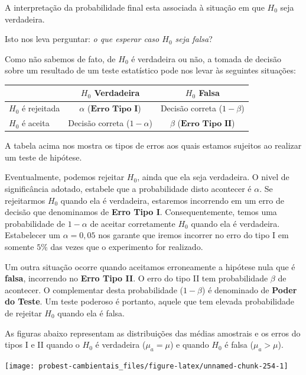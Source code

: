 \documentclass[
]{book}
\begin{document}
A interpretação da probabilidade final esta associada à situação em que \(H_0\) seja verdadeira.

Isto nos leva perguntar: \emph{o que esperar caso \(H_0\) seja falsa}?

Como não sabemos de fato, de \(H_0\) é verdadeira ou não, a tomada de decisão sobre um resultado de um teste estatístico pode nos levar às seguintes situações:

\begin{longtable}[]{@{}lcc@{}}
\toprule
& \(H_0\) Verdadeira & \(H_0\) Falsa \\
\midrule
\endhead
\(H_0\) é rejeitada & \(\alpha\) (\(\textbf{Erro Tipo I}\)) & Decisão correta (\(1-\beta\)) \\
\(H_0\) é aceita & Decisão correta (\(1-\alpha\)) & \(\beta\) (\(\textbf{Erro Tipo II}\)) \\
\bottomrule
\end{longtable}

A tabela acima nos mostra os tipos de erros aos quais estamos sujeitos ao realizar um teste de hipótese.

Eventualmente, podemos rejeitar \(H_0\), ainda que ela seja verdadeira. O nivel de significância adotado, estabele que a probabilidade disto acontecer é \(\alpha\). Se rejeitarmos \(H_0\) quando ela é verdadeira, estaremos incorrendo em um erro de decisão que denominamos de \textbf{Erro Tipo I}. Consequentemente, temos uma probabilidade de \(1 - \alpha\) de aceitar corretamente \(H_0\) quando ela é verdadeira. Estabelecer um \(\alpha = 0,05\) nos garante que iremos incorrer no erro do tipo I em somente \(5\%\) das vezes que o experimento for realizado.

Um outra situação ocorre quando aceitamos erroneamente a hipótese nula que é \textbf{falsa}, incorrendo no \textbf{Erro Tipo II}. O erro do tipo II tem probabilidade \(\beta\) de acontecer. O complementar desta probabilidade (\(1-\beta\)) é denominado de \textbf{Poder do Teste}. Um teste poderoso é portanto, aquele que tem elevada probabilidade de rejeitar \(H_0\) quando ela é falsa.

As figuras abaixo representam as distribuições das médias amostrais e os erros do tipos I e II quando o \(H_0\) é verdadeira (\(\mu_a = \mu\)) e quando \(H_0\) é falsa (\(\mu_a > \mu\)).

\begin{center}\texttt{[image: probest-cambientais\_files/figure-latex/unnamed-chunk-254-1]} \end{center}
\end{document}
